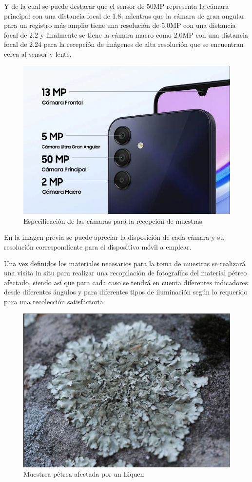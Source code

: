 Y de la cual se puede destacar que el sensor de 50MP representa la cámara principal con una distancia focal de 1.8, mientras que la cámara de gran angular para un registro más amplio tiene una resolución de 5.0MP con una distancia focal de 2.2 y finalmente se tiene la cámara macro como 2.0MP con una distancia focal de 2.24 para la recepción de imágenes de alta resolución que se encuentran cerca al sensor y lente.

\begin{figure}[h]
	\centering
	\includegraphics[width=0.5\linewidth]{media/especificaciones-camara}
	\caption{Especificación de las cámaras para la recepción de muestras}
	\label{fig:especificaciones-camara}
\end{figure}

En la imagen previa se puede apreciar la disposición de cada cámara y su resolución correspondiente para el dispositivo móvil a emplear.

Una vez definidos los materiales necesarios para la toma de muestras se realizará una visita in situ para realizar una recopilación de fotografías del material pétreo afectado, siendo así que para cada caso se tendrá en cuenta diferentes indicadores desde diferentes ángulos y para diferentes tipos de iluminación según lo requerido para una recolección satisfactoria.

\begin{figure}[h]
	\centering
	\includegraphics[width=0.5\linewidth]{./media/ejemplo-muestra-liquen}
	\caption{Muestrea pétrea afectada por un Liquen}
	\label{fig:ejemplo-muestra-liquen}
\end{figure}


